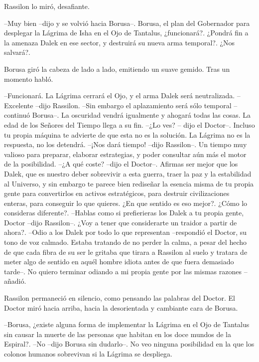Rassilon lo miró, desafiante. 

--Muy bien --dijo y se volvió hacia Borusa--. Borusa, el plan del Gobernador para desplegar la Lágrima de Isha en el Ojo de Tantalus, ¿funcionará?. ¿Pondrá fin a la amenaza Dalek en ese sector, y destruirá su nueva arma temporal?. ¿Nos salvará?.
 
Borusa giró la cabeza de lado a lado, emitiendo un suave gemido. Tras un momento habló. 

--Funcionará. La Lágrima cerrará el Ojo, y el arma Dalek será neutralizada. 
--Excelente --dijo Rassilon. 
--Sin embargo el aplazamiento será sólo temporal --continuó Borusa--. La oscuridad vendrá igualmente y ahogará todas las cosas. La edad de los Señores del Tiempo llega a su fin. 
--¿Lo ves? -- dijo el Doctor--. Incluso tu propia máquina te advierte de que esta no es la solución. La Lágrima no es la respuesta, no los detendrá.  
--¡Nos dará tiempo! --dijo Rassilon--. Un tiempo muy valioso para preparar, elaborar estrategias, y poder consultar aún más el motor de la posibilidad.  
--¿A qué coste? --dijo el Doctor--. Afirmas ser mejor que los Dalek, que es nuestro deber sobrevivir a esta guerra, traer la paz y la estabilidad al Universo, y sin embargo te parece bien rediseñar la esencia misma de tu propia gente para convertirlos en activos estratégicos, para destruir civilizaciones enteras, para conseguir lo que quieres. ¿En que sentido es eso mejor?. ¿Cómo lo consideras diferente?. 
--Hablas como si prefierieras los Dalek a tu propia gente, Doctor --dijo Rassilon--. ¿Voy a tener que considerarte un traidor a partir de ahora?. 
--Odio a los Dalek por todo lo que representan --respondió el Doctor, su tono de voz calmado. Estaba tratando de no perder la calma, a pesar del hecho de que cada fibra de su ser le gritaba que tirara a Rassilon al suelo y tratara de meter algo de sentido en aquél hombre idiota antes de que fuera demasiado tarde--. No quiero terminar odiando a mi propia gente por las mismas razones --añadió. 

Rassilon permaneció en silencio, como pensando las palabras del Doctor. El Doctor miró hacia arriba, hacia la desorientada y cambiante cara de Borusa. 

--Borusa, ¿existe alguna forma de implementar la Lágrima en el Ojo de Tantalus sin causar la muerte de las personas que habitan en los doce mundos de la Espiral?. 
--No --dijo Borusa sin dudarlo--. No veo ninguna posibilidad en la que los colonos humanos sobrevivan si la Lágrima se despliega. 

